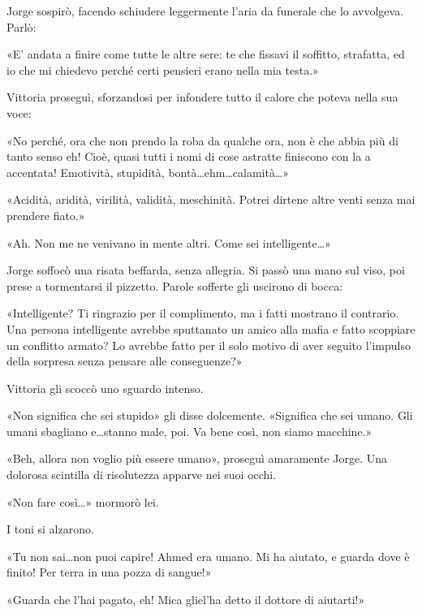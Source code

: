 Jorge sospirò, facendo schiudere leggermente l'aria da funerale che lo avvolgeva. Parlò:

«E' andata a finire come tutte le altre sere: te che fissavi il soffitto, strafatta, ed io che mi chiedevo perché certi pensieri erano nella mia testa.»

Vittoria proseguì, sforzandosi per infondere tutto il calore che poteva nella sua voce:

«No perché, ora che non prendo la roba da qualche ora, non è che abbia più di tanto senso eh! Cioè, quasi tutti i nomi di cose astratte finiscono con la a accentata! Emotività, stupidità, bontà\ldots ehm\ldots calamità\ldots»

«Acidità, aridità, virilità, validità, meschinità. Potrei dirtene altre venti senza mai prendere fiato.»

«Ah. Non me ne venivano in mente altri. Come sei intelligente\ldots»

Jorge soffocò una risata beffarda, senza allegria. Si passò una mano sul viso, poi prese a tormentarsi il pizzetto. Parole sofferte gli uscirono di bocca:

«Intelligente? Ti ringrazio per il complimento, ma i fatti mostrano il contrario. Una persona intelligente avrebbe sputtanato un amico alla mafia e fatto scoppiare un conflitto armato? Lo avrebbe fatto per il solo motivo di aver seguito l'impulso della sorpresa senza pensare alle conseguenze?»

Vittoria gli scoccò uno sguardo intenso.

«Non significa che sei stupido» gli disse dolcemente. «Significa che sei umano. Gli umani sbagliano e\ldots stanno male, poi. Va bene così, non siamo macchine.»

«Beh, allora non voglio più essere umano», proseguì amaramente Jorge. Una dolorosa scintilla di risolutezza apparve nei suoi occhi.

«Non fare così\ldots» mormorò lei.

I toni si alzarono.

«Tu non sai\ldots non puoi capire! Ahmed era umano. Mi ha aiutato, e guarda dove è finito! Per terra in una pozza di sangue!»

«Guarda che l'hai pagato, eh! Mica gliel'ha detto il dottore di aiutarti!»

